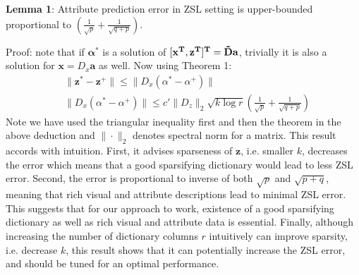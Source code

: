 \documentclass[letterpaper]{article} %
\def\x{\mathbf{x}}
\def\a{\mathbf{a}}
\def\z{\mathbf{z}}
\def\balpha{\boldsymbol{\alpha}}
\begin{document}
\textbf{Lemma 1}: Attribute prediction error in ZSL setting  is  upper-bounded proportional to $(\frac{1}{\sqrt{p}}+\frac{1}{\sqrt{q+p}})$. 


 Proof:  note that if $\balpha^*$ is a solution of $[\bf{x}^T,\bf{z}^T]^T=\tilde{D}\bf{a}$, trivially it is also a solution for $ \x =D_x\a$ as well. Now using Theorem 1:
\begin{equation}
\begin{split}
&\|\z^*-\z^+\|\le \|D_x(\alpha^*-\alpha^+)\|\\
& \|D_x(\alpha^*-\alpha^+)\| \le c'\|D_z\|_2 \sqrt{k\log r}(\frac{1}{\sqrt{p}}+\frac{1}{\sqrt{q+p}})
\end{split}
\label{eq:error}
\end{equation}    
 Note we have used the triangular inequality first and then the theorem in the above deduction and  $\|\cdot\|_2$ denotes  spectral norm for a matrix. This result accords with intuition. First, it advises sparseness of $\z$, i.e. smaller $k$, decreases the error which means that a good sparsifying dictionary would lead to less ZSL error. Second, the error is proportional to inverse of both $\sqrt{p}$ and $\sqrt{p+q}$, meaning that rich visual and attribute descriptions lead to minimal ZSL error. This suggests that for our approach to work, existence of a good sparsifying dictionary as well as rich  visual and attribute data is essential. Finally, although increasing the number of dictionary columns $r$ intuitively can improve sparsity, i.e. decrease $k$, this result shows that it can potentially increase the ZSL error, and should be tuned for an optimal performance.
\end{document}
